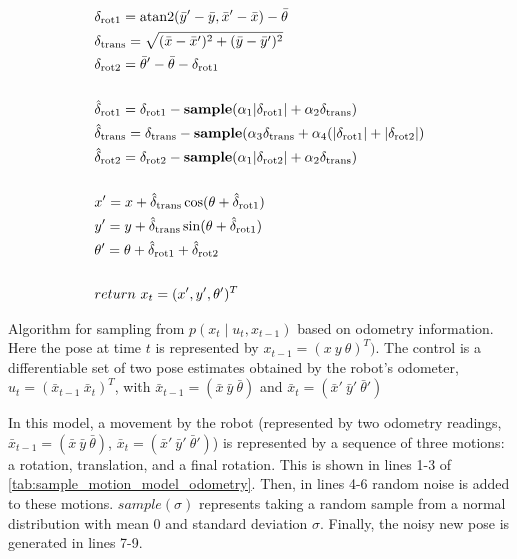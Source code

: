 \documentclass[thesis.tex]{subfile}
\begin{document}
\begin{table}
\centering
\begin{align}
&\delta_{\text{rot1}} = \text{atan2}(\bar{y}' - \bar{y}, \bar{x}' - \bar{x}) - \bar{\theta}\\ 
&\delta_{\text{trans}} = \sqrt{(\bar{x} - \bar{x}')^2 + (\bar{y} - \bar{y}')^2}\\
&\delta_{\text{rot2}} = \bar{\theta}' - \bar{\theta} - \delta_{\text{rot1}}\\
\notag \\
&\hat{\delta}_{\text{rot1}} = \delta_{\text{rot1}} - \textbf{sample}(\alpha_1\lvert\delta_{\text{rot1}}\rvert + \alpha_2\delta_{\text{trans}})\\
&\hat{\delta}_{\text{trans}} = \delta_{\text{trans}} - \textbf{sample}(\alpha_3\delta_{\text{trans}} + \alpha_4(\lvert\delta_{\text{rot1}}\rvert + \lvert\delta_{\text{rot2}}\rvert)\\
&\hat{\delta}_{\text{rot2}} = \delta_{\text{rot2}} - \textbf{sample}(\alpha_1\lvert\delta_{\text{rot2}}\rvert + \alpha_2\delta_{\text{trans}})\\
\notag \\
&x' = x + \hat{\delta}_{\text{trans}}\cos(\theta + \hat{\delta}_{\text{rot1}})\\
&y' = y + \hat{\delta}_{\text{trans}}\sin(\theta + \hat{\delta}_{\text{rot1}})\\
&\theta' = \theta + \hat{\delta}_{\text{rot1}} + \hat{\delta}_{\text{rot2}}\\
\notag \\
&return \ x_t = (x', y', \theta')^T
\end{align}
\caption[Algorithm sample\_motion\_model\_odometry]{Algorithm for sampling from $p(x_t \mid u_t, x_{t-1})$ based on odometry information. Here the pose at time $t$ is represented by $x_{t-1} = (x\ y\ \theta)^T)$. The control is a differentiable set of two pose estimates obtained by the robot's odometer, $u_t = (\bar{x}_{t-1}\ \bar{x}_t)^T$, with $\bar{x}_{t-1} = (\bar{x}\ \bar{y}\ \bar{\theta})$ and $\bar{x}_{t} = (\bar{x}'\ \bar{y}'\ \bar{\theta}')$}
\label{tab:sample_motion_model_odometry}
\end{table} 

In this model, a movement by the robot (represented by two odometry readings, $\bar{x}_{t-1} = (\bar{x}\ \bar{y}\ \bar{\theta})$, $\bar{x}_{t} = (\bar{x}'\ \bar{y}'\ \bar{\theta}')$) is represented by a sequence of three motions: a rotation, translation, and a final rotation. This is shown in lines 1-3 of \autoref{tab:sample_motion_model_odometry}. Then, in lines 4-6 random noise is added to these motions. $sample(\sigma)$ represents taking a random sample from a normal distribution with mean 0 and standard deviation $\sigma$. Finally, the noisy new pose is generated in lines 7-9.
\end{document}
